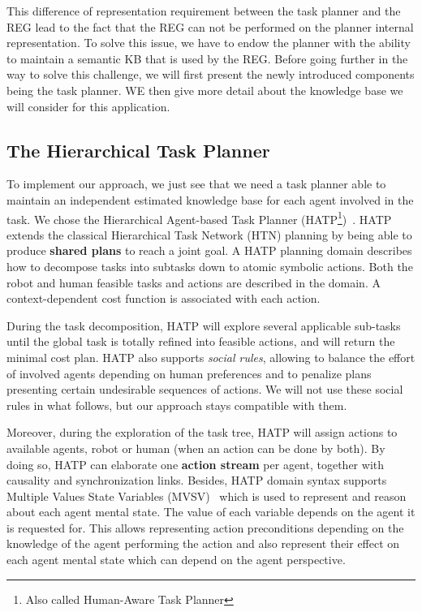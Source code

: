 This difference of representation requirement between the task planner and the REG lead to the fact that the REG can not be performed on the planner internal representation. To solve this issue, we have to endow the planner with the ability to maintain a semantic KB that is used by the REG. Before going further in the way to solve this challenge, we will first present the newly introduced components being the task planner. WE then give more detail about the knowledge base we will consider for this application.


\subsection{The Hierarchical Task Planner}

To implement our approach, we just see that we need a task planner able to maintain an independent estimated knowledge base for each agent involved in the task. We chose the Hierarchical Agent-based Task Planner (HATP\footnote{Also called Human-Aware Task Planner})~\cite{lallement_2014_hatp}. HATP extends the classical Hierarchical Task Network (HTN) planning by being able to produce \textbf{shared plans} to reach a joint goal. A HATP planning domain describes how to decompose tasks into subtasks down to atomic symbolic actions. Both the robot and human feasible tasks and actions are described in the domain. A context-dependent cost function is associated with each action. 

During the task decomposition, HATP will explore several applicable sub-tasks until the global task is totally refined into feasible actions, and will return the minimal cost plan. HATP also supports \textit{social rules}, allowing to balance the effort of involved agents depending on human preferences and to penalize plans presenting certain undesirable sequences of actions. We will not use these social rules in what follows, but our approach stays compatible with them.

Moreover, during the exploration of the task tree, HATP will assign actions to available agents, robot or human (when an action can be done by both). By doing so, HATP can elaborate one \textbf{action stream} per agent, together with causality and synchronization links. 
Besides, HATP domain syntax supports Multiple Values State Variables (MVSV)~\cite{guitton_2012_belief} which is used to represent and reason about each agent mental state. The value of each variable depends on the agent it is requested for. This allows representing action preconditions depending on the knowledge of the agent performing the action and also represent their effect on each agent mental state which can depend on the agent perspective.

